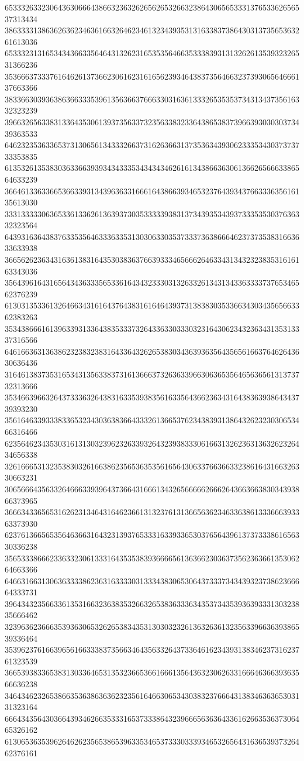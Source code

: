 65333263323064363066643866323632626562653266323864306565333137653362656537313434
38633331386362636234636166326462346132343935313163383738643031373565363261613036
65333231316534343663356464313262316535356466353338393131326261353932326531366236
35366637333761646261373662306162316165623934643837356466323739306564666137663366
38336630393638636633353961356366376663303163613332653535373431343735616332323239
39663265633831336435306139373563373235633832336438653837396639303030373439363533
64623235363365373130656134333266373162636631373536343930623335343037373733353835
61353261353830363366393934343335343434346261613438663630613662656663386564633239
36646133633665366339313439636331666164386639346532376439343766333635616135613030
33313333306365336133626136393730353333393831373439353439373335353037636332323564
64393163643837633535646333633531303063303537333736386664623737353831663633633938
36656262363431636138316435303836376639333465666264633431343232383531616163343036
35643961643165643436333565336164343233303132633261343134336333373765346562376239
61303135336132646634316164376438316164643937313838303533663430343565663362383263
35343866616139633931336438353337326433633033303231643062343236343135313337316566
64616636313638623238323831643364326265383034363936356435656166376462643630636436
31646138373531653431356338373161366637326363396630636535646563656131373732313666
35346639663264373336326438316335393835616335643662363431643836393864343739393230
35616463393338336532343036383664333261366537623438393138643262323030653466316466
62356462343530316131303239623263393264323938333061663132623631363262326434656338
32616665313235383032616638623565363535616564306337663663323861643166326330663231
30656664356332646663393964373664316661343265666662666264366366383034393866373965
36663433656531626231346431646236613132376131366563623463363861333666393363373930
62376136656535646366316432313937653331633933653037656439613737333861656330336238
35653338666233633230613331643535383936666561363662303637356236366135306264663366
64663166313063633338623631633330313334383065306437333734343932373862366664333731
39643432356633613531663236383532663265383633363435373435393639333130323835666462
32396362366635393630653262653834353130303232613632636132356339663639386539336464
35396237616639656166333837356634643563326437336461623439313834623731623761323539
36653938336538313033646531353236653661666135643632306263316664636639363566636238
34643462326538663536386363623235616466306534303832376664313834636365303131323164
66643435643036643934626635333165373338643239666563636433616266353637306465326162
61306536353962646262356538653963353465373330333934653265643163653937326462376161
